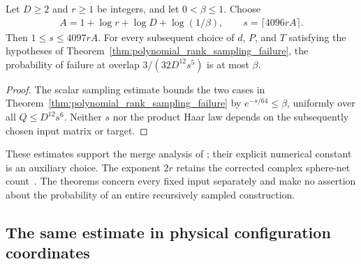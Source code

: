 \begin{theorem}
    \label{thm:uniform_rank_sampling_failure}
    \leanok
    Let $D\ge2$ and $r\ge1$ be integers, and let $0<\beta\le1$.
    Choose
    \begin{align}
        A=1+\log r+\log D+\log(1/\beta),
        \qquad s=\lceil4096rA\rceil.
    \end{align}
    Then $1\le s\le4097rA$. For every subsequent choice of $d$, $P$,
    and $T$ satisfying the hypotheses of
    Theorem~\ref{thm:polynomial_rank_sampling_failure},
    the probability of failure at overlap $3/(32D^{12}s^5)$ is at
    most $\beta$.
\end{theorem}
\begin{proof}\leanok
    The scalar sampling estimate bounds the two cases in
    Theorem~\ref{thm:polynomial_rank_sampling_failure} by
    $e^{-s/64}\le\beta$, uniformly over all
    $Q\le D^{12}s^6$. Neither $s$ nor the product Haar law depends on
    the subsequently chosen input matrix or target.
\end{proof}

These estimates support the merge analysis of
\cite[lines 1777--1817]{Arad2016RigorousRG}; their explicit numerical
constant is an auxiliary choice. The exponent $2r$ retains the corrected
complex sphere-net count~\cite{gap:alvv16_random_sampling_net_count}.
The theorems concern every fixed input separately and make no assertion
about the probability of an entire recursively sampled construction.

\subsection{The same estimate in physical configuration coordinates}

